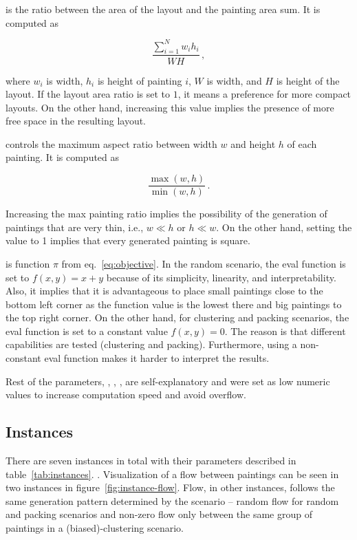  is the ratio between the area of the layout and the painting area sum.
It is computed as

\[
    \dfrac{\sum\limits_{i=1}^{N} w_i h_i}{WH}\,,
\]

where $w_i$ is width, $h_i$ is height of painting $i$, $W$ is width, and $H$ is height of the layout.
If the layout area ratio is set to $1$, it means a preference for more compact layouts.
On the other hand,
increasing this value implies the presence of more free space in the resulting layout.

 controls the maximum aspect ratio between width $w$ and height $h$ of each painting.
It is computed as

\[
    \dfrac{\max(w,h)}{\min(w,h)}\,.
\]

Increasing the max painting ratio implies the possibility of the generation of paintings
that are very thin, i.e., $w \ll h$ or $h \ll w$.
On the other hand, setting the value to 1
implies that every generated painting is square.

 is function $\pi$ from eq.~\ref{eq:objective}.
In the random scenario, the eval function is set to $f(x,y) = x+y$ because of its simplicity, linearity, and interpretability.
Also, it implies that it is advantageous to place small paintings close to the bottom left corner as the function value is the lowest there and
big paintings to the top right corner.
On the other hand, for clustering and packing scenarios, the eval function is set to a constant value $f(x,y) = 0$.
The reason is that different capabilities are tested (clustering and packing).
Furthermore, using a non-constant eval function makes it harder to interpret the results.

Rest of the parameters, , , , 
are self-explanatory and were set as low numeric values to increase computation speed and avoid overflow.


\subsection{Instances}
There are seven instances in total with their parameters described in table~\ref{tab:instances}.
.
Visualization of a flow between paintings can be seen in two instances in figure~\ref{fig:instance-flow}.
Flow, in other instances, follows the same generation pattern determined by the scenario
– random flow for random and packing scenarios and non-zero flow only between
the same group of paintings in a (biased)-clustering scenario.


